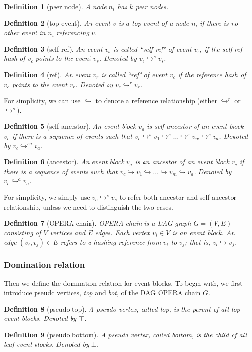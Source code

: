\documentclass{article}
\newtheorem{defn}{Definition}[section]
\newcommand{\eself}{\hookrightarrow^{s}}
\newcommand{\eref}{\hookrightarrow^{r}}
\newcommand{\eancestor}{\hookrightarrow^{a}}
\newcommand{\eselfancestor}{\hookrightarrow^{sa}}
\newcommand{\erefz}{\hookrightarrow}
\begin{document}
\begin{defn}[peer node]
	A node $n_i$ has $k$ peer nodes.
\end{defn}

\begin{defn}[top event]
	An event $v$ is a top event of a node $n_i$ if there is no other event in $n_i$ referencing $v$.
\end{defn}


\begin{defn}[self-ref]
	An event $v_s$ is called ``self-ref" of event $v_c$, if the self-ref hash of $v_c$ points to the event $v_s$. Denoted by $v_c \eself v_s$.
\end{defn}

\begin{defn}[ref]
	An event $v_r$ is called ``ref" of event $v_c$ if the reference hash of $v_c$ points to the event $v_r$. Denoted by $v_c \eref v_r$.
\end{defn}

For simplicity, we can use $\erefz$ to denote a reference relationship (either $\eref$ or $\eself$).


\begin{defn}[self-ancestor]
	An event block $v_a$ is self-ancestor of an event block $v_c$ if there is a sequence of events such that $v_c \eself v_1 \eself \dots \eself v_m \eself v_a $. Denoted by $v_c \eselfancestor v_a$.
\end{defn}



\begin{defn}[ancestor]
	An event block $v_a$ is an ancestor of an event block $v_c$ if there is a sequence of events such that $v_c \erefz v_1 \erefz \dots \erefz v_m \erefz v_a $. Denoted by $v_c \eancestor v_a$.
\end{defn}


For simplicity, we simply use $v_c \eancestor v_s$ to refer both ancestor and self-ancestor relationship, unless we need to distinguish the two cases.

\begin{defn}[OPERA chain]
	OPERA chain is a DAG graph $G = (V, E)$ consisting of $V$ vertices and $E$ edges. Each vertex $v_i \in V$ is an event block. An edge $(v_i,v_j) \in E$ refers to a hashing reference from $v_i$ to $v_j$; that is, $v_i \erefz v_j$.
\end{defn}

\subsubsection{Domination relation}
Then we define the domination relation for event blocks. To begin with, we first introduce pseudo vertices, \emph{top} and \emph{bot}, of the DAG OPERA chain $G$.
\begin{defn}[pseudo top]
	A pseudo vertex, called top, is the parent of all top event blocks. Denoted by $\top$.
\end{defn}
\begin{defn}[pseudo bottom]
	A pseudo vertex, called bottom, is the child of all leaf event blocks. Denoted by $\bot$.
\end{defn}
\end{document}
